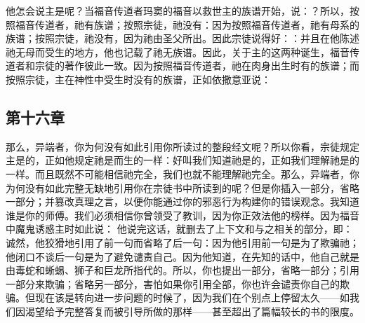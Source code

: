 \par

他怎会说主是呢？当福音传道者玛窦的福音以救世主的族谱开始，说：？所以，按照福音传道者，祂有族谱；按照宗徒，祂没有：因为按照福音传道者，祂有母系的族谱；按照宗徒，祂没有，因为祂由圣父所出。因此宗徒说得好：：并且在他陈述祂无母而受生的地方，他也记载了祂无族谱。因此，关于主的这两种诞生，福音传道者和宗徒的著作彼此一致。因为按照福音传道者，祂在肉身出生时有的族谱；而按照宗徒，主在神性中受生时没有的族谱，正如依撒意亚说：\par


\subsection{第十六章}

\par

那么，异端者，你为何没有如此引用你所读过的整段经文呢？所以你看，宗徒规定主是的，正如他规定祂是而生的一样：好叫我们知道祂是的，正如我们理解祂是的一样。而且既然不可能相信祂完全，我们也就不能理解祂完全。那么，异端者，你为何没有如此完整无缺地引用你在宗徒书中所读到的呢？但是你插入一部分，省略一部分；并篡改真理之言，以便你能通过你的邪恶行为构建你的错误观念。我知道谁是你的师傅。我们必须相信你曾领受了教训，因为你正效法他的榜样。因为福音中魔鬼诱惑主时如此说：  他说完这话，就删去了上下文和与之相关的部分，即： 诚然，他狡猾地引用了前一句而省略了后一句：因为他引用前一句是为了欺骗祂；他闭口不谈后一句是为了避免谴责自己。因为他知道，在先知的话中，他自己就是由毒蛇和蜥蜴、狮子和巨龙所指代的。所以，你也提出一部分，省略一部分；引用一部分来欺骗；省略另一部分，害怕如果你引用全部，你也许会谴责你自己的欺骗。但现在该是转向进一步问题的时候了，因为我们在个别点上停留太久——如我们因渴望给予完整答复而被引导所做的那样——甚至超出了篇幅较长的书的限度。\par


